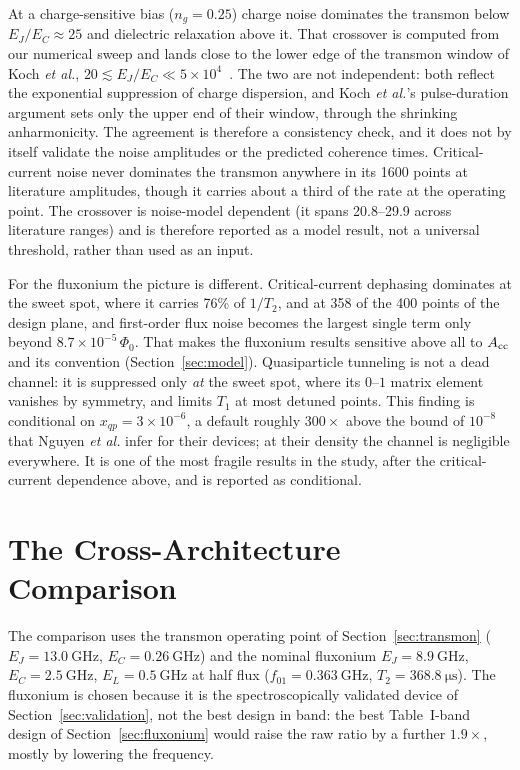 \documentclass{SciPost}
\begin{document}
At a charge-sensitive bias ($n_g = 0.25$) charge noise dominates the transmon below
$E_J/E_C \approx 25$ and dielectric relaxation above it. That crossover is computed from our numerical sweep and lands close to the lower edge of the transmon
window of Koch \emph{et al.}, $20\lesssim E_J/E_C\ll5\times10^4$~\cite{koch2007}. The two are not
independent: both reflect the exponential suppression of charge dispersion, and Koch \emph{et
al.}'s pulse-duration argument sets only the upper end of their window, through the shrinking
anharmonicity. The agreement is therefore a consistency check, and it does not by itself validate the
noise amplitudes or the predicted coherence times. Critical-current noise never dominates the transmon anywhere in its 1600 points at literature
amplitudes, though it carries about a third of the rate at the operating point. The crossover is noise-model dependent (it spans 20.8--29.9
across literature ranges) and is therefore reported as a model result, not a universal threshold, rather than used as an
input.

For the fluxonium the picture is different. Critical-current dephasing dominates at the sweet
spot, where it carries 76\% of $1/T_2$, and at 358 of the 400 points of the design plane, and
first-order flux noise becomes the largest single term only beyond $8.7\times10^{-5}\,\Phi_0$. That
makes the fluxonium results sensitive above all to $A_{\rm cc}$ and its convention (Section~\ref{sec:model}). Quasiparticle tunneling is not a
dead channel: it is suppressed only \emph{at} the sweet spot, where its $0$--$1$ matrix
element vanishes by symmetry, and limits $T_1$ at most detuned points. This finding is
conditional on $x_{qp} = 3\times10^{-6}$, a default roughly $300\times$ above the bound of
$10^{-8}$ that Nguyen \emph{et al.} infer for their devices; at their density the channel is negligible everywhere. It is one of the most fragile results in the study, after the critical-current dependence above,
and is reported as conditional.

\section{The Cross-Architecture Comparison}
\label{sec:q3}

The comparison uses the transmon operating point of Section~\ref{sec:transmon}
($E_J = \SI{13.0}{\giga\hertz}$, $E_C = \SI{0.26}{\giga\hertz}$) and the nominal fluxonium
$E_J = \SI{8.9}{\giga\hertz}$, $E_C = \SI{2.5}{\giga\hertz}$, $E_L = \SI{0.5}{\giga\hertz}$ at
half flux ($f_{01} = \SI{0.363}{\giga\hertz}$, $T_2 = \SI{368.8}{\micro\second}$). The fluxonium
is chosen because it is the spectroscopically validated device of Section~\ref{sec:validation},
not the best design in band: the best Table~I-band design of Section~\ref{sec:fluxonium} would raise the raw ratio by a further $1.9\times$, mostly by lowering the frequency.
\end{document}

